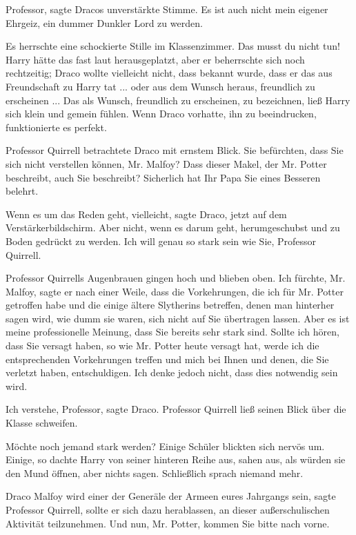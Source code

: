 \glqq{}Professor\grqq{}, sagte Dracos unverstärkte Stimme. \glqq{}Es ist auch
nicht mein eigener Ehrgeiz, ein dummer Dunkler Lord zu werden.\grqq{}

Es herrschte eine schockierte Stille im Klassenzimmer. Das musst du nicht tun!
Harry hätte das fast laut herausgeplatzt, aber er beherrschte sich noch
rechtzeitig; Draco wollte vielleicht nicht, dass bekannt wurde, dass er das aus
Freundschaft zu Harry tat ... oder aus dem Wunsch heraus, freundlich zu
erscheinen ... Das als Wunsch, freundlich zu erscheinen, zu bezeichnen, ließ
Harry sich klein und gemein fühlen. Wenn Draco vorhatte, ihn zu beeindrucken,
funktionierte es perfekt.

Professor Quirrell betrachtete Draco mit ernstem Blick. \glqq{}Sie befürchten,
dass Sie sich nicht verstellen können, Mr. Malfoy? Dass dieser Makel, der Mr.
Potter beschreibt, auch Sie beschreibt? Sicherlich hat Ihr Papa Sie eines
Besseren belehrt.\grqq{}

\glqq{}Wenn es um das Reden geht, vielleicht\grqq{}, sagte Draco, jetzt auf dem
Verstärkerbildschirm. \glqq{}Aber nicht, wenn es darum geht, herumgeschubst und
zu Boden gedrückt zu werden. Ich will genau so stark sein wie Sie, Professor
Quirrell.\grqq{}

Professor Quirrells Augenbrauen gingen hoch und blieben oben. \glqq{}Ich fürchte,
Mr. Malfoy\grqq{}, sagte er nach einer Weile, \glqq{}dass die Vorkehrungen, die
ich für Mr. Potter getroffen habe und die einige ältere Slytherins betreffen,
denen man hinterher sagen wird, wie dumm sie waren, sich nicht auf Sie
übertragen lassen. Aber es ist meine professionelle Meinung, dass Sie bereits
sehr stark sind. Sollte ich hören, dass Sie versagt haben, so wie Mr. Potter
heute versagt hat, werde ich die entsprechenden Vorkehrungen treffen und mich
bei Ihnen und denen, die Sie verletzt haben, entschuldigen. Ich denke jedoch
nicht, dass dies notwendig sein wird.\grqq{}

\glqq{}Ich verstehe, Professor\grqq{}, sagte Draco. Professor Quirrell ließ
seinen Blick über die Klasse schweifen.

\glqq{}Möchte noch jemand stark werden?\grqq{} Einige Schüler blickten sich
nervös um. Einige, so dachte Harry von seiner hinteren Reihe aus, sahen aus, als
würden sie den Mund öffnen, aber nichts sagen. Schließlich sprach niemand mehr.

\glqq{}Draco Malfoy wird einer der Generäle der Armeen eures Jahrgangs
sein\grqq{}, sagte Professor Quirrell, \glqq{}sollte er sich dazu herablassen, an
dieser außerschulischen Aktivität teilzunehmen. Und nun, Mr. Potter, kommen Sie
bitte nach vorne.\grqq{}


